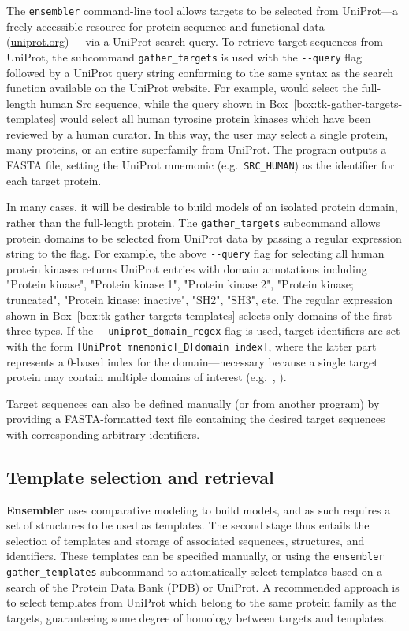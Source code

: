 \documentclass[aps,prl,preprint,nofootinbib,superscriptaddress,linenumbers]{revtex4-1}
\begin{document}
The {\tt ensembler} command-line tool allows targets to be selected from UniProt---a freely accessible resource for protein sequence and functional data (\href{http://www.uniprot.org/}{uniprot.org})~\cite{uniprot:2015}---via a UniProt search query.
To retrieve target sequences from UniProt, the subcommand {\tt gather\_targets} is used with the {\tt -{}-query} flag followed by a UniProt query string conforming to the same syntax as the search function available on the UniProt website.
For example,   would select the full-length human Src sequence, while the query shown in Box~\ref{box:tk-gather-targets-templates} would select all human tyrosine protein kinases which have been reviewed by a human curator.
In this way, the user may select a single protein, many proteins, or an entire superfamily from UniProt.
The program outputs a FASTA file, setting the UniProt mnemonic (e.g.~{\tt SRC\_HUMAN}) as the identifier for each target protein.

In many cases, it will be desirable to build models of an isolated protein domain, rather than the full-length protein.
The {\tt gather\_targets} subcommand allows protein domains to be selected from UniProt data by passing a regular expression string to the  flag. 
For example, the above {\tt -{}-query} flag for selecting all human protein kinases returns UniProt entries with domain annotations including "Protein kinase", "Protein kinase 1", "Protein kinase 2", "Protein kinase; truncated", "Protein kinase; inactive", "SH2", "SH3", etc.
The regular expression shown in Box~\ref{box:tk-gather-targets-templates} selects only domains of the first three types.
If the {\tt -{}-uniprot\_domain\_regex} flag is used, target identifiers are set with the form {\tt [UniProt mnemonic]\_D[domain index]}, where the latter part represents a 0-based index for the domain---necessary because a single target protein may contain multiple domains of interest (e.g.~, ).

Target sequences can also be defined manually (or from another program) by providing a FASTA-formatted text file containing the desired target sequences with corresponding arbitrary identifiers.

\subsection{Template selection and retrieval}

{\bf Ensembler} uses comparative modeling to build models, and as such requires a set of structures to be used as templates.
The second stage thus entails the selection of templates and storage of associated sequences, structures, and identifiers.
These templates can be specified manually, or using the {\tt ensembler gather\_templates} subcommand to automatically select templates based on a search of the Protein Data Bank (PDB) or UniProt.
A recommended approach is to select templates from UniProt which belong to the same protein family as the targets, guaranteeing some degree of homology between targets and templates.
\end{document}
